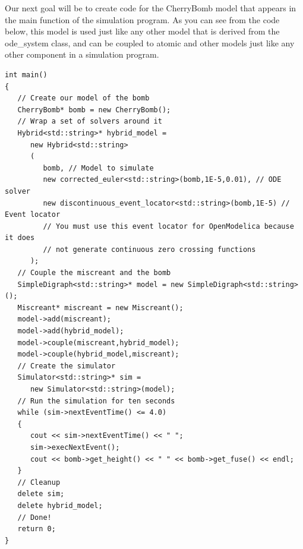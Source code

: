 Our next goal will be to create code for the CherryBomb model that appears in the main function of the simulation program. As you can see from the code below, this model is used just like any other model that is derived from the ode\_system class, and can be coupled to atomic and other models just like any other component in a simulation program.
\begin{verbatim}
int main()
{
   // Create our model of the bomb
   CherryBomb* bomb = new CherryBomb();
   // Wrap a set of solvers around it
   Hybrid<std::string>* hybrid_model =
      new Hybrid<std::string>
      (
         bomb, // Model to simulate
         new corrected_euler<std::string>(bomb,1E-5,0.01), // ODE solver
         new discontinuous_event_locator<std::string>(bomb,1E-5) // Event locator
         // You must use this event locator for OpenModelica because it does
         // not generate continuous zero crossing functions
      );
   // Couple the miscreant and the bomb
   SimpleDigraph<std::string>* model = new SimpleDigraph<std::string>();
   Miscreant* miscreant = new Miscreant();
   model->add(miscreant);
   model->add(hybrid_model);
   model->couple(miscreant,hybrid_model);
   model->couple(hybrid_model,miscreant);
   // Create the simulator
   Simulator<std::string>* sim =
      new Simulator<std::string>(model);
   // Run the simulation for ten seconds
   while (sim->nextEventTime() <= 4.0)
   {
      cout << sim->nextEventTime() << " ";
      sim->execNextEvent();
      cout << bomb->get_height() << " " << bomb->get_fuse() << endl;
   }
   // Cleanup
   delete sim;
   delete hybrid_model;
   // Done!
   return 0;
}
\end{verbatim}

